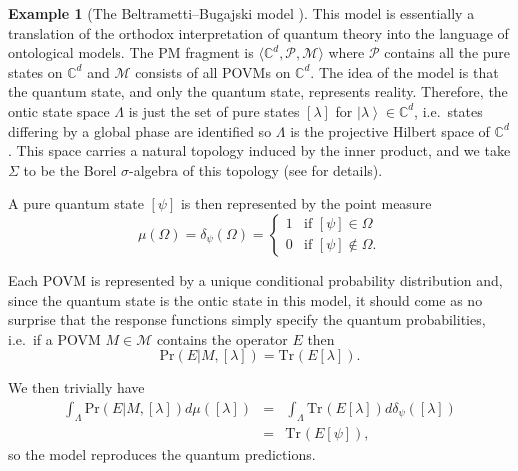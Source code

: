 \documentclass[DIV=calc,fontsize=12pt]{scrartcl} %
\theoremstyle{definition}
\newtheorem{example}[definition]{Example}
\theoremstyle{plain}
\newcommand{\Ket}[1]{\ensuremath{\left \vert #1 \right \rangle}}
\newcommand{\Proj}[1]{\ensuremath{\left [ #1 \right ]}}
\newcommand{\Tr}[2][]{\ensuremath{\text{Tr}_{#1} \left ( #2 \right )}}
\begin{document}
\begin{example}[The Beltrametti--Bugajski model \cite{Beltrametti1995}]
This model is essentially a translation of the orthodox
interpretation of quantum theory into the language of ontological
models.  The PM fragment is $\langle \mathbb{C}^d, \mathcal{P},
\mathcal{M}\rangle$ where $\mathcal{P}$ contains all the pure states
on $\mathbb{C}^d$ and $\mathcal{M}$ consists of all POVMs on
$\mathbb{C}^d$.  The idea of the model is that the quantum state,
and only the quantum state, represents reality.  Therefore, the
ontic state space $\Lambda$ is just the set of pure states
$\Proj{\lambda}$ for $\Ket{\lambda} \in \mathbb{C}^d$, i.e.\ states
differing by a global phase are identified so $\Lambda$ is the
projective Hilbert space of $\mathbb{C}^d$.  This space carries a
natural topology induced by the inner product, and we take $\Sigma$
to be the Borel $\sigma$-algebra of this topology (see
\cite{Stulpe2007} for details).

A pure quantum state $\Proj{\psi}$ is then represented by the point
measure
\begin{equation}
\mu(\Omega) = \delta_{\psi}(\Omega) = \begin{cases} 1 &
\text{if}\,\, \Proj{\psi} \in \Omega \\
0 & \text{if}\,\, \Proj{\psi} \notin \Omega. \end{cases}
\end{equation}

Each POVM is represented by a unique conditional probability
distribution and, since the quantum state is the ontic state in this
model, it should come as no surprise that the response functions
simply specify the quantum probabilities, i.e.\ if a POVM $M \in
\mathcal{M}$ contains the operator $E$ then
\begin{equation}
\text{Pr}(E|M,\Proj{\lambda}) = \Tr{E \Proj{\lambda}}.
\end{equation}

We then trivially have
\begin{eqnarray}
\int_{\Lambda} \text{Pr}(E|M,\Proj{\lambda}) d\mu(\Proj{\lambda})  &=&
\int_{\Lambda} \Tr{E \Proj{\lambda}} d
\delta_{\psi}(\Proj{\lambda})\nonumber\\
&=& \Tr{E \Proj{\psi}},
\end{eqnarray}
so the model reproduces the quantum predictions.


\end{example}
\end{document}
